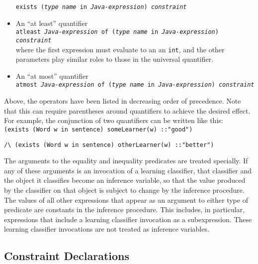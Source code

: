 \begin{itemize}
      {\tt exists (\emph{type name} in \emph{Java-expression})
        \emph{constraint}}
\item An ``at least'' quantifier \\
      \mbox{\hspace{.4cm}}
      {\tt atleast \emph{Java-expression} of (\emph{type name} in
          \emph{Java-expression}) \emph{constraint}} \\
      where the first expression must evaluate to an an {\tt int}, and the
      other parameters play similar roles to those in the universal
      quantifier.
\item An ``at most'' quantifier \\
      \mbox{\hspace{.4cm}}
      {\tt atmost \emph{Java-expression} of (\emph{type name} in
          \emph{Java-expression}) \emph{constraint}}
\end{itemize}

\noindent
Above, the operators have been listed in decreasing order of precedence.  Note
that this can require parentheses around quantifiers to achieve the desired
effect.  For example, the conjunction of two quantifiers can be written like
this: \\

\vspace{-.25cm}
{\tt (exists (Word w in sentence) someLearner(w) ::\hspace{.2cm}"good")}

\hspace{.2cm}
{\tt \verb|/\| (exists (Word w in sentence)
                  otherLearner(w) ::\hspace{.2cm}"better")} \\
\vspace{-.25cm}

The arguments to the equality and inequality predicates are treated specially.
If any of these arguments is an invocation of a learning classifier, that
classifier and the object it classifies become an inference variable, so that
the value produced by the classifier on that object is subject to change by
the inference procedure.  The values of all other expressions that appear as
an argument to either type of predicate are constants in the inference
procedure.  This includes, in particular, expressions that include a learning
classifier invocation as a subexpression.  These learning classifier
invocations are not treated as inference variables.


\subsection{Constraint Declarations} \label{subsection:constraintDeclarations}

